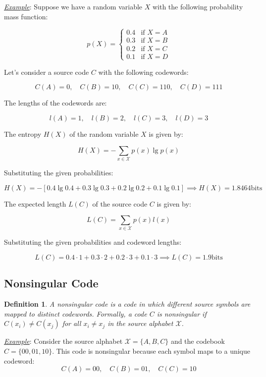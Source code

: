 \documentclass[a4paper,10pt]{article}
\newtheorem{definition}{Definition}[section] %
\newcommand{\hlt}[1]{\colorbox{color3}{#1}}
\begin{document}
\noindent \underline{\textit{Example}}: Suppose we have a random variable $ X $ with the following probability mass function:

$$
p(X) = \begin{cases}
0.4 & \text{if } X = A \\
0.3 & \text{if } X = B \\
0.2 & \text{if } X = C \\
0.1 & \text{if } X = D
\end{cases}
$$

Let's consider a source code $ C $ with the following codewords:

$$
C(A) = 0, \quad C(B) = 10, \quad C(C) = 110, \quad C(D) = 111
$$

The lengths of the codewords are:

$$
l(A) = 1, \quad l(B) = 2, \quad l(C) = 3, \quad l(D) = 3
$$

The entropy $ H(X) $ of the random variable $ X $ is given by:

$$
H(X) = - \sum_{x \in \mathcal{X}} p(x) \lg p(x)
$$

Substituting the given probabilities:

$$
H(X) = - [0.4 \lg 0.4 + 0.3 \lg 0.3 + 0.2 \lg 0.2 + 0.1 \lg 0.1] \implies H(X) = 1.8464 \text{bits}
$$

The expected length $ L(C) $ of the source code $ C $ is given by:

$$
L(C) = \sum_{x \in \mathcal{X}} p(x) l(x)
$$

Substituting the given probabilities and codeword lengths:

$$
L(C) = 0.4 \cdot 1 + 0.3 \cdot 2 + 0.2 \cdot 3 + 0.1 \cdot 3 \implies L(C) = 1.9 \text{bits}
$$

\subsection{Nonsingular Code}

\begin{definition}
    A \hlt{nonsingular code} is a code in which different source symbols are mapped to distinct codewords. Formally, a code $C$ is nonsingular if $C(x_i) \neq C(x_j)$ for all $x_i \neq x_j$ in the source alphabet $\mathcal{X}$.
\end{definition}

\noindent \underline{\textit{Example}}: Consider the source alphabet $\mathcal{X} = \{A, B, C\}$ and the codebook $C = \{00, 01, 10\}$. This code is nonsingular because each symbol maps to a unique codeword:
$$
C(A) = 00, \quad C(B) = 01, \quad C(C) = 10
$$
\end{document}
